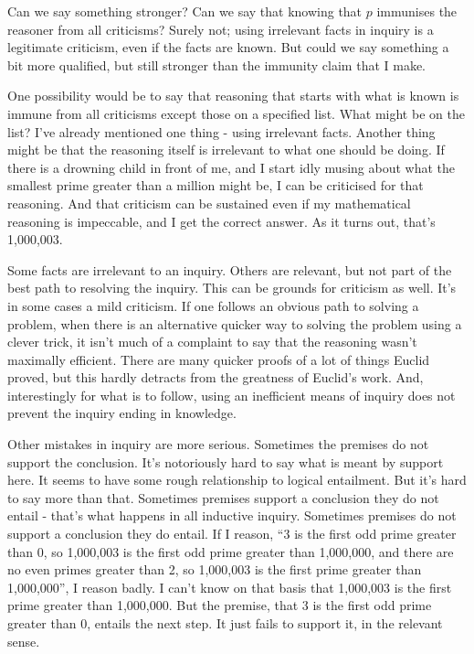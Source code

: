 \documentclass[11pt,]{book}
\begin{document}
Can we say something stronger? Can we say that knowing that \(p\) immunises the reasoner from all criticisms? Surely not; using irrelevant facts in inquiry is a legitimate criticism, even if the facts are known. But could we say something a bit more qualified, but still stronger than the immunity claim that I make.

One possibility would be to say that reasoning that starts with what is known is immune from all criticisms except those on a specified list. What might be on the list? I've already mentioned one thing - using irrelevant facts. Another thing might be that the reasoning itself is irrelevant to what one should be doing. If there is a drowning child in front of me, and I start idly musing about what the smallest prime greater than a million might be, I can be criticised for that reasoning. And that criticism can be sustained even if my mathematical reasoning is impeccable, and I get the correct answer. As it turns out, that's 1,000,003.

Some facts are irrelevant to an inquiry. Others are relevant, but not part of the best path to resolving the inquiry. This can be grounds for criticism as well. It's in some cases a mild criticism. If one follows an obvious path to solving a problem, when there is an alternative quicker way to solving the problem using a clever trick, it isn't much of a complaint to say that the reasoning wasn't maximally efficient. There are many quicker proofs of a lot of things Euclid proved, but this hardly detracts from the greatness of Euclid's work. And, interestingly for what is to follow, using an inefficient means of inquiry does not prevent the inquiry ending in knowledge.

Other mistakes in inquiry are more serious. Sometimes the premises do not support the conclusion. It's notoriously hard to say what is meant by support here. It seems to have some rough relationship to logical entailment. But it's hard to say more than that. Sometimes premises support a conclusion they do not entail - that's what happens in all inductive inquiry. Sometimes premises do not support a conclusion they do entail. If I reason, ``3 is the first odd prime greater than 0, so 1,000,003 is the first odd prime greater than 1,000,000, and there are no even primes greater than 2, so 1,000,003 is the first prime greater than 1,000,000'', I reason badly. I can't know on that basis that 1,000,003 is the first prime greater than 1,000,000. But the premise, that 3 is the first odd prime greater than 0, entails the next step. It just fails to support it, in the relevant sense.
\end{document}
